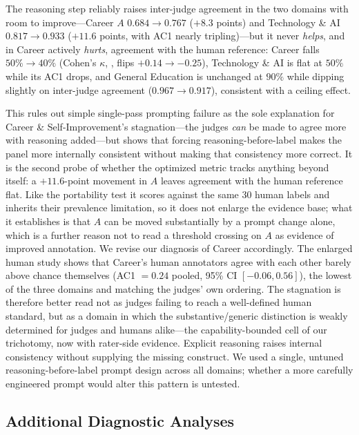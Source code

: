 \documentclass[letterpaper]{article}
\begin{document}
The reasoning step reliably raises inter-judge agreement in the two domains
with room to improve---Career $A$ $0.684 \rightarrow 0.767$ ($+8.3$ points)
and Technology \& AI $0.817 \rightarrow 0.933$ ($+11.6$ points, with AC1
nearly tripling)---but it never \emph{helps}, and in Career actively
\emph{hurts}, agreement with the human reference: Career falls
$50\% \rightarrow 40\%$ (Cohen's $\kappa$, \citealp{cohen1960}, flips $+0.14
\rightarrow -0.25$), Technology \& AI is flat at $50\%$ while its AC1 drops,
and General Education is unchanged at $90\%$ while dipping slightly on
inter-judge agreement ($0.967 \rightarrow 0.917$), consistent with a ceiling
effect.

This rules out simple single-pass prompting failure as the sole explanation
for Career \& Self-Improvement's stagnation---the judges \emph{can} be made
to agree more with reasoning added---but shows that forcing
reasoning-before-label makes the panel more internally consistent without
making that consistency more correct. It is the second probe of whether the optimized
metric tracks anything beyond itself: a $+11.6$-point movement in $A$ leaves
agreement with the human reference flat. Like the portability test it scores
against the same 30 human labels and inherits their prevalence limitation, so
it does not enlarge the evidence base; what it establishes is that $A$ can be
moved substantially by a prompt change alone, which is a further reason not to
read a threshold crossing on $A$ as evidence of improved annotation. We revise our diagnosis of Career accordingly. The enlarged human study shows that Career's human annotators
agree with each other barely above chance themselves (AC1 $=0.24$ pooled,
95\% CI $[-0.06, 0.56]$), the lowest of the three domains and matching the
judges' own ordering. The stagnation is therefore better read not as judges
failing to reach a well-defined human standard, but as a domain in which the
substantive/generic distinction is weakly determined for judges and humans
alike---the capability-bounded cell of our trichotomy, now with rater-side
evidence. Explicit reasoning raises internal consistency without supplying
the missing construct. We used
a single, untuned reasoning-before-label prompt design across all domains;
whether a more carefully engineered prompt would alter this pattern is
untested.

\subsection{Additional Diagnostic Analyses}
\end{document}
